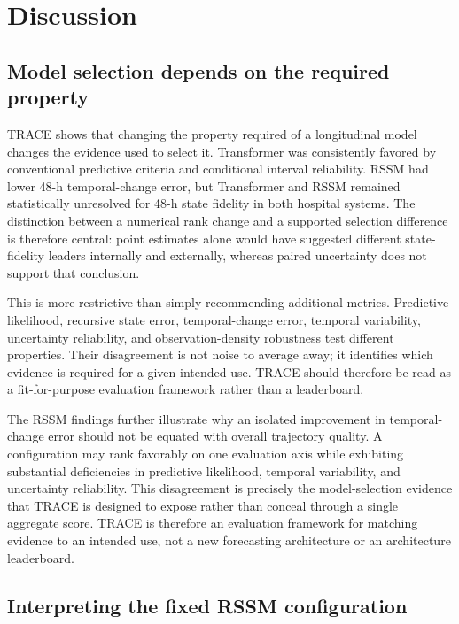 \documentclass[preprint,12pt]{elsarticle}
\begin{document}
\section{Discussion}

\subsection{Model selection depends on the required property}

TRACE shows that changing the property required of a longitudinal model changes the evidence used to select it. Transformer was consistently favored by conventional predictive criteria and conditional interval reliability. RSSM had lower 48-h temporal-change error, but Transformer and RSSM remained statistically unresolved for 48-h state fidelity in both hospital systems. The distinction between a numerical rank change and a supported selection difference is therefore central: point estimates alone would have suggested different state-fidelity leaders internally and externally, whereas paired uncertainty does not support that conclusion.

This is more restrictive than simply recommending additional metrics. Predictive likelihood, recursive state error, temporal-change error, temporal variability, uncertainty reliability, and observation-density robustness test different properties. Their disagreement is not noise to average away; it identifies which evidence is required for a given intended use. TRACE should therefore be read as a fit-for-purpose evaluation framework rather than a leaderboard.

The RSSM findings further illustrate why an isolated improvement in
temporal-change error should not be equated with overall trajectory
quality. A configuration may rank favorably on one evaluation axis
while exhibiting substantial deficiencies in predictive likelihood,
temporal variability, and uncertainty reliability. This disagreement
is precisely the model-selection evidence that TRACE is designed to
expose rather than conceal through a single aggregate score. TRACE is
therefore an evaluation framework for matching evidence to an intended
use, not a new forecasting architecture or an architecture leaderboard.

\subsection{Interpreting the fixed RSSM configuration}
\end{document}
